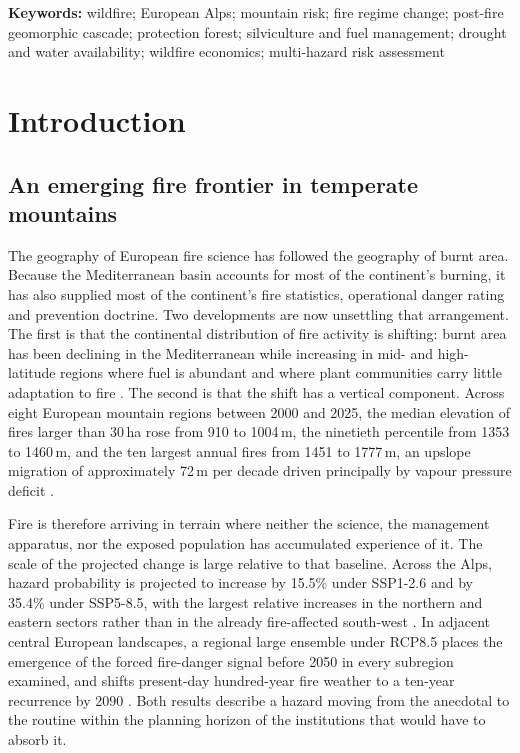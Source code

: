 \documentclass[11pt,a4paper]{article}
\begin{document}
\noindent\textbf{Keywords:}
wildfire; European Alps; mountain risk; fire regime change; post-fire geomorphic cascade; protection forest; silviculture and fuel management; drought and water availability; wildfire economics; multi-hazard risk assessment


\section{Introduction}

\subsection{An emerging fire frontier in temperate mountains}

The geography of European fire science has followed the geography of burnt area. Because the Mediterranean basin accounts for most of the continent's burning, it has also supplied most of the continent's fire statistics, operational danger rating and prevention doctrine. Two developments are now unsettling that arrangement. The first is that the continental distribution of fire activity is shifting: burnt area has been declining in the Mediterranean while increasing in mid- and high-latitude regions where fuel is abundant and where plant communities carry little adaptation to fire \citep{miller_compounding_2025}. The second is that the shift has a vertical component. Across eight European mountain regions between 2000 and 2025, the median elevation of fires larger than 30\,ha rose from 910 to 1004\,m, the ninetieth percentile from 1353 to 1460\,m, and the ten largest annual fires from 1451 to 1777\,m, an upslope migration of approximately 72\,m per decade driven principally by vapour pressure deficit \citep{beloiu_climatedriven_2026}.

Fire is therefore arriving in terrain where neither the science, the management apparatus, nor the exposed population has accumulated experience of it. The scale of the projected change is large relative to that baseline. Across the Alps, hazard probability is projected to increase by 15.5\% under SSP1-2.6 and by 35.4\% under SSP5-8.5, with the largest relative increases in the northern and eastern sectors rather than in the already fire-affected south-west \citep{gerberding_mapping_2025}. In adjacent central European landscapes, a regional large ensemble under RCP8.5 places the emergence of the forced fire-danger signal before 2050 in every subregion examined, and shifts present-day hundred-year fire weather to a ten-year recurrence by 2090 \citep{miller_climate_2024}. Both results describe a hazard moving from the anecdotal to the routine within the planning horizon of the institutions that would have to absorb it.
\end{document}

